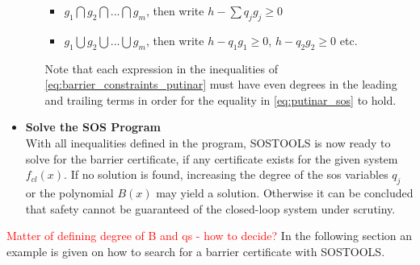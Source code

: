 \begin{itemize}
\begin{itemize}
	\begin{itemize}
		\item $g_1 \bigcap g_2 \bigcap ... \bigcap g_m$, then write $h - \sum q_jg_j\geq 0$
		\item $g_1 \bigcup g_2 \bigcup ... \bigcup g_m$, then write $h - q_1g_1\geq 0$, $h - q_2g_2\geq 0$ etc.
	\end{itemize} 
	Note that each expression in the inequalities of \autoref{eq:barrier_constraints_putinar} must have even degrees in the leading and trailing terms in order for the equality in \autoref{eq:putinar_sos} to hold.
\end{itemize}
\item \textbf{Solve the SOS Program}\\
With all inequalities defined in the program, SOSTOOLS is now ready to solve for the barrier certificate, if any certificate exists for the given system $f_{cl}(x)$. If no solution is found, increasing the degree of the \gls{sos} variables $q_j$ or the polynomial $B(x)$ may yield a solution. Otherwise it can be concluded that safety cannot be guaranteed of the closed-loop system under scrutiny. 
\end{itemize}





\textcolor{red}{Matter of defining degree of B and qs - how to decide?}
In the following section an example is given on how to search for a barrier certificate with SOSTOOLS.











